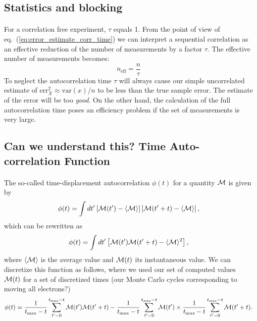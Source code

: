 \documentclass[%
twoside,                 %
final,                   %
10pt]{article}
\begin{document}
\subsection{Statistics and blocking}

\paragraph{}
For a correlation free experiment, $\tau$
equals 1. From the point of view of
eq.~(\ref{eq:error_estimate_corr_time}) we can interpret a sequential
correlation as an effective reduction of the number of measurements by
a factor $\tau$. The effective number of measurements becomes:
\[
n_\mathrm{eff} = \frac{n}{\tau}
\]
To neglect the autocorrelation time $\tau$ will always cause our
simple uncorrelated estimate of $\mathrm{err}_X^2\approx \mathrm{var}(x)/n$ to
be less than the true sample error. The estimate of the error will be
too \emph{good}. On the other hand, the calculation of the full
autocorrelation time poses an efficiency problem if the set of
measurements is very large.







\subsection{Can we understand this? Time Auto-correlation Function}

\paragraph{}
The so-called time-displacement autocorrelation $\phi(t)$ for a quantity ${\cal M}$ is given by
\[
\phi(t) = \int dt' \left[{\cal M}(t')-\langle {\cal M} \rangle\right]\left[{\cal M}(t'+t)-\langle {\cal M} \rangle\right],
\]
which can be rewritten as 
\[
\phi(t) = \int dt' \left[{\cal M}(t'){\cal M}(t'+t)-\langle {\cal M} \rangle^2\right],
\]
where $\langle {\cal M} \rangle$ is the average value and
${\cal M}(t)$ its instantaneous value. We can discretize this function as follows, where we used our
set of computed values ${\cal M}(t)$ for a set of discretized times (our Monte Carlo cycles corresponding to moving all electrons?)
\[
\phi(t)  = \frac{1}{t_{\mathrm{max}}-t}\sum_{t'=0}^{t_{\mathrm{max}}-t}{\cal M}(t'){\cal M}(t'+t)
-\frac{1}{t_{\mathrm{max}}-t}\sum_{t'=0}^{t_{\mathrm{max}}-t}{\cal M}(t')\times
\frac{1}{t_{\mathrm{max}}-t}\sum_{t'=0}^{t_{\mathrm{max}}-t}{\cal M}(t'+t).
\label{eq:phitf}
\]
\end{document}
